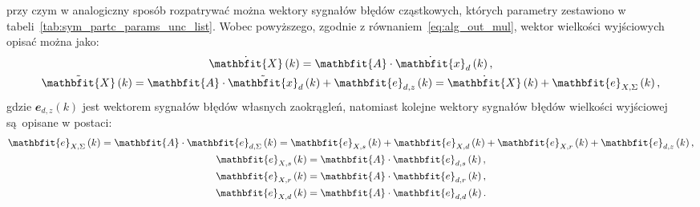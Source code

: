 przy czym w analogiczny sposób rozpatrywać można wektory sygnałów błędów cząstkowych, których parametry zestawiono w tabeli~\ref{tab:sym_partc_params_unc_list}. Wobec powyższego, zgodnie z równaniem~\eqref{eq:alg_out_mul}, wektor wielkości wyjściowych opisać można jako:
\begin{gather}
\dot{\mathbfit{X}} \emb{k} = \mathbfit{A} \cdot \dot{\mathbfit{x}}_{d} \emb{k} \label{eq:sym_partd_output_ideal}, \\
\tilde{\mathbfit{X}} \emb{k} = \mathbfit{A} \cdot \tilde{\mathbfit{x}}_{d} \emb{k} + \mathbfit{e}_{d,z} \emb{k} = \dot{\mathbfit{X}} \emb{k} + \mathbfit{e}_{X,\Sigma} \emb{k} \label{eq:sym_partd_output_real},
\end{gather}
gdzie $\mathbfit{e}_{d,z}(k)$ jest wektorem sygnałów błędów własnych zaokrągleń, natomiast kolejne wektory sygnałów błędów wielkości wyjściowej są opisane w postaci:
\begin{gather}
\mathbfit{e}_{X,\Sigma} \emb{k} = \mathbfit{A} \cdot \mathbfit{e}_{d,\Sigma} \emb{k} = \mathbfit{e}_{X,s} \emb{k} + \mathbfit{e}_{X,d} \emb{k} + \mathbfit{e}_{X,r} \emb{k} + \mathbfit{e}_{d,z} \emb{k} \label{eq:sym_partd_output_error_sum}, \\
\mathbfit{e}_{X,s} \emb{k} = \mathbfit{A} \cdot \mathbfit{e}_{d,s} \emb{k} \label{eq:sym_partd_output_error_stat}, \\
\mathbfit{e}_{X,r} \emb{k} = \mathbfit{A} \cdot \mathbfit{e}_{d,r} \emb{k} \label{eq:sym_partd_output_error_rand}, \\
\mathbfit{e}_{X,d} \emb{k} = \mathbfit{A} \cdot \mathbfit{e}_{d,d} \emb{k} \label{eq:sym_partd_output_error_dyn}.
\end{gather}

